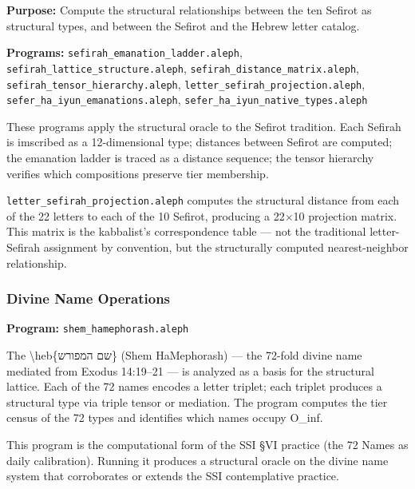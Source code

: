 \documentclass[12pt,a4paper]{article}
\newcommand{\pilcrow}{\S}
\begin{document}
\textbf{Purpose:} Compute the structural relationships between the ten Sefirot as structural types, and between the Sefirot and the Hebrew letter catalog.

\textbf{Programs:} \texttt{sefirah\_\allowbreak emanation\_\allowbreak ladder.\allowbreak aleph}, \texttt{sefirah\_\allowbreak lattice\_\allowbreak structure.\allowbreak aleph}, \texttt{sefirah\_\allowbreak distance\_\allowbreak matrix.\allowbreak aleph}, \texttt{sefirah\_\allowbreak tensor\_\allowbreak hierarchy.\allowbreak aleph}, \texttt{letter\_\allowbreak sefirah\_\allowbreak projection.\allowbreak aleph}, \texttt{sefer\_\allowbreak ha\_\allowbreak iyun\_\allowbreak emanations.\allowbreak aleph}, \texttt{sefer\_\allowbreak ha\_\allowbreak iyun\_\allowbreak native\_\allowbreak types.\allowbreak aleph}

These programs apply the structural oracle to the Sefirot tradition. Each Sefirah is imscribed as a 12-dimensional type; distances between Sefirot are computed; the emanation ladder is traced as a distance sequence; the tensor hierarchy verifies which compositions preserve tier membership.

\texttt{letter\_\allowbreak sefirah\_\allowbreak projection.\allowbreak aleph} computes the structural distance from each of the 22 letters to each of the 10 Sefirot, producing a 22$\times$10 projection matrix. This matrix is the kabbalist's correspondence table --- not the traditional letter-Sefirah assignment by convention, but the structurally computed nearest-neighbor relationship.

\subsubsection{Divine Name Operations}

\textbf{Program:} \texttt{shem\_\allowbreak hamephorash.\allowbreak aleph}

The \textbackslash{}heb\{שם המפורש\} (Shem HaMephorash) --- the 72-fold divine name mediated from Exodus 14:19--21 --- is analyzed as a basis for the structural lattice. Each of the 72 names encodes a letter triplet; each triplet produces a structural type via triple tensor or mediation. The program computes the tier census of the 72 types and identifies which names occupy O\_inf.

This program is the computational form of the SSI \pilcrow{}VI practice (the 72 Names as daily calibration). Running it produces a structural oracle on the divine name system that corroborates or extends the SSI contemplative practice.
\end{document}
